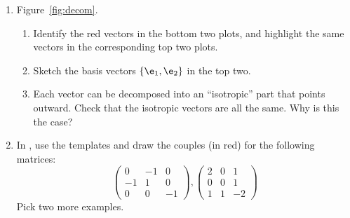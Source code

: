 \documentclass[11pt,titlepage,fleqn]{article}
\begin{document}
\begin{enumerate}

\item Figure~\ref{fig:decom}.
%
\begin{enumerate}
\item Identify the red vectors in the bottom two plots, and highlight the same vectors in the corresponding top two plots.
\item Sketch the basis vectors $\{\e_1,\e_2\}$ in the top two.
\item Each vector can be decomposed into an ``isotropic'' part that points outward. Check that the isotropic vectors are all the same. Why is this the case?
\end{enumerate}


\item In , use the templates and draw the couples (in red) for the following matrices:
%
\begin{equation*}
\begin{pmatrix} 0 & -1 & 0 \\ -1 & 1 & 0 \\ 0 & 0 & -1 \end{pmatrix},
\begin{pmatrix} 2 &  0 & 1 \\  0 & 0 & 1 \\ 1 & 1 & -2 \end{pmatrix}
\end{equation*}
%
Pick two more examples.


\end{enumerate}






\end{document}
